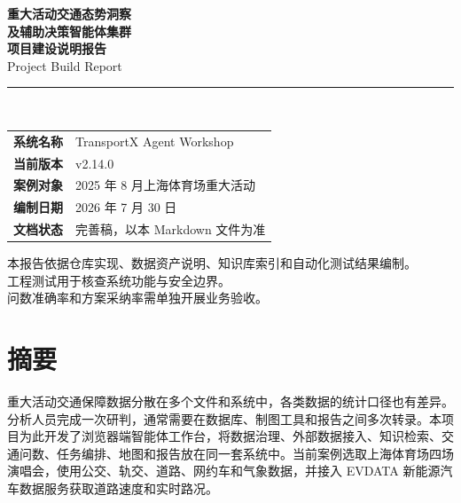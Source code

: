 \documentclass[a4paper,11pt]{article}
\newcommand{\metarow}[2]{\textbf{#1} & #2 \\}
\begin{document}
\begin{titlepage}
\centering
\vspace*{2cm}

{\sffamily\bfseries\Huge 重大活动交通态势洞察\\[0.4em]及辅助决策智能体集群}\\[2.5em]
{\Large\bfseries\sffamily 项目建设说明报告}\\[1em]
{\large\sffamily Project Build Report}\\[6em]

\rule{0.55\linewidth}{0.5pt}\\[2.5em]

\begin{tabularx}{0.78\linewidth}{@{}lX@{}}
\toprule
\rowcolor{TableHead}
\multicolumn{2}{@{}l}{\sffamily\bfseries 项目元信息} \\
\midrule
\metarow{系统名称}{TransportX Agent Workshop}
\metarow{当前版本}{v2.14.0}
\metarow{案例对象}{2025 年 8 月上海体育场重大活动}
\metarow{编制日期}{2026 年 7 月 30 日}
\metarow{文档状态}{完善稿，以本 Markdown 文件为准}
\bottomrule
\end{tabularx}

\vfill

{\small\sffamily 本报告依据仓库实现、数据资产说明、知识库索引和自动化测试结果编制。\\工程测试用于核查系统功能与安全边界。\\问数准确率和方案采纳率需单独开展业务验收。}

\vspace{1cm}
\end{titlepage}

\section*{摘要}

重大活动交通保障数据分散在多个文件和系统中，各类数据的统计口径也有差异。分析人员完成一次研判，通常需要在数据库、制图工具和报告之间多次转录。本项目为此开发了浏览器端智能体工作台，将数据治理、外部数据接入、知识检索、交通问数、任务编排、地图和报告放在同一套系统中。当前案例选取上海体育场四场演唱会，使用公交、轨交、道路、网约车和气象数据，并接入 EVDATA 新能源汽车数据服务获取道路速度和实时路况。
\end{document}
